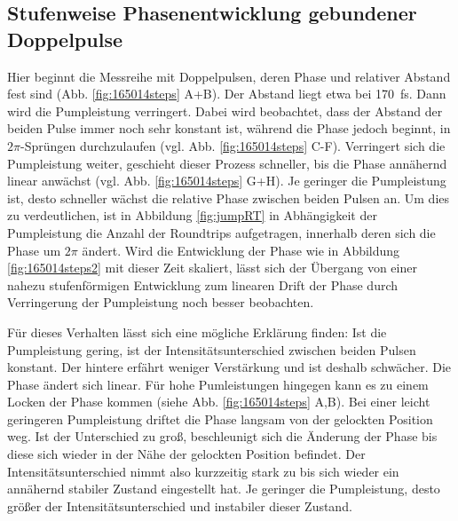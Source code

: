 \documentclass[bachelor,       %
               twoside,        %
               BCOR10mm,       %
               liststotoc,nomtotoc,bibtotoc, %
               english,ngerman, %
               final,          %
               ]{GAUBM}
\begin{document}
\subsection{Stufenweise Phasenentwicklung gebundener Doppelpulse}
Hier beginnt die Messreihe mit Doppelpulsen, deren Phase und relativer Abstand fest sind (Abb. \ref{fig:165014steps} A+B).
Der Abstand liegt etwa bei 170 \,fs.
Dann wird die Pumpleistung verringert.
Dabei wird beobachtet, dass der Abstand der beiden Pulse immer noch sehr konstant ist, während die Phase jedoch beginnt, in $2\pi$-Sprüngen durchzulaufen (vgl. Abb. \ref{fig:165014steps} C-F).
Verringert sich die Pumpleistung weiter, geschieht dieser Prozess schneller, bis die Phase annähernd linear anwächst (vgl. Abb. \ref{fig:165014steps} G+H).
Je geringer die Pumpleistung ist, desto schneller wächst die relative Phase zwischen beiden Pulsen an.
Um dies zu verdeutlichen, ist in Abbildung \ref{fig:jumpRT} in Abhängigkeit der Pumpleistung die Anzahl der Roundtrips aufgetragen, innerhalb deren sich die Phase um $2\pi$ ändert.
Wird die Entwicklung der Phase wie in Abbildung \ref{fig:165014steps2} mit dieser Zeit skaliert, lässt sich der Übergang von einer nahezu stufenförmigen Entwicklung zum linearen Drift der Phase durch Verringerung der Pumpleistung noch besser beobachten.

Für dieses Verhalten lässt sich eine  mögliche Erklärung finden:
Ist die Pumpleistung gering, ist der Intensitätsunterschied zwischen beiden Pulsen konstant.
Der hintere erfährt weniger Verstärkung und ist deshalb schwächer.
Die Phase ändert sich linear.
Für hohe Pumleistungen hingegen kann es zu einem Locken der Phase kommen (siehe Abb. \ref{fig:165014steps} A,B).
Bei einer leicht geringeren Pumpleistung driftet die Phase langsam von der gelockten Position weg.
Ist der Unterschied zu groß, beschleunigt sich die Änderung der Phase bis diese sich wieder in der Nähe der gelockten Position befindet.
Der Intensitätsunterschied nimmt also kurzzeitig stark zu bis sich wieder ein annähernd stabiler Zustand eingestellt hat.
Je geringer die Pumpleistung, desto größer der Intensitätsunterschied und instabiler dieser Zustand.
\end{document}
